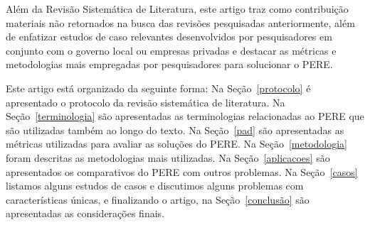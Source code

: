 Além da Revisão Sistemática de Literatura, este artigo traz como contribuição materiais não retornados na busca das revisões pesquisadas anteriormente, além de enfatizar estudos de caso relevantes desenvolvidos por pesquisadores em conjunto com o governo local ou empresas privadas e destacar as métricas e metodologias mais empregadas por pesquisadores para solucionar o \ac{PERE}.


Este artigo está organizado da seguinte forma:  Na Seção~\ref{protocolo} é apresentado o protocolo da revisão sistemática de literatura. Na Seção~\ref{terminologia}  são apresentadas as terminologias relacionadas ao PERE que são utilizadas também ao longo do texto. Na Seção~\ref{pad} são apresentadas as métricas utilizadas para avaliar as soluções do \ac{PERE}. Na Seção~\ref{metodologia}  foram descritas as metodologias mais utilizadas. Na Seção~\ref{aplicacoes} são apresentados os comparativos do \ac{PERE} com outros problemas. Na Seção~\ref{casos} listamos alguns estudos de casos e discutimos alguns problemas com características únicas, e finalizando o artigo, na Seção~\ref{conclusão} são apresentadas as considerações finais.







